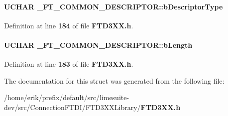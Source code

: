 \paragraph[{b\+Descriptor\+Type}]{\setlength{\rightskip}{0pt plus 5cm}U\+C\+H\+AR \+\_\+\+F\+T\+\_\+\+C\+O\+M\+M\+O\+N\+\_\+\+D\+E\+S\+C\+R\+I\+P\+T\+O\+R\+::b\+Descriptor\+Type}\label{struct__FT__COMMON__DESCRIPTOR_a9394d46c11e4104bf5eb8e0a27c2b654}


Definition at line {\bf 184} of file {\bf F\+T\+D3\+X\+X.\+h}.

\paragraph[{b\+Length}]{\setlength{\rightskip}{0pt plus 5cm}U\+C\+H\+AR \+\_\+\+F\+T\+\_\+\+C\+O\+M\+M\+O\+N\+\_\+\+D\+E\+S\+C\+R\+I\+P\+T\+O\+R\+::b\+Length}\label{struct__FT__COMMON__DESCRIPTOR_af07d92166d5879de069d1a87ed100564}


Definition at line {\bf 183} of file {\bf F\+T\+D3\+X\+X.\+h}.



The documentation for this struct was generated from the following file\+:\begin{DoxyCompactItemize}
\item 
/home/erik/prefix/default/src/limesuite-\/dev/src/\+Connection\+F\+T\+D\+I/\+F\+T\+D3\+X\+X\+Library/{\bf F\+T\+D3\+X\+X.\+h}\end{DoxyCompactItemize}

